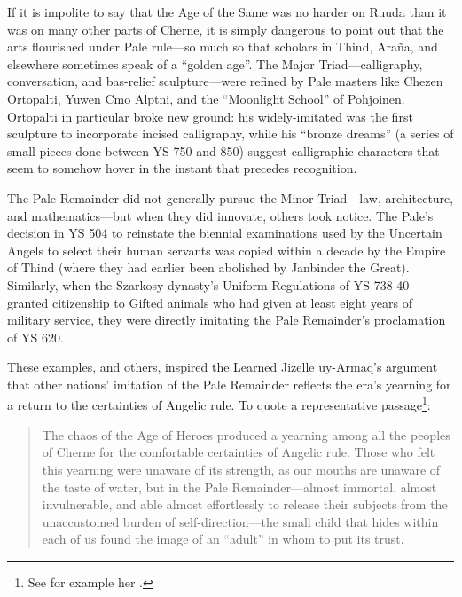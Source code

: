 \documentclass[12pt]{report}
\begin{document}
If it is impolite to say that the Age of the Same was no harder on
Ruuda than it was on many other parts of Cherne, it is simply
dangerous to point out that the arts flourished under Pale rule---so
much so that scholars in Thind, Ara\~na, and elsewhere sometimes speak
of a ``golden age''.  The Major Triad---calligraphy, conversation, and
bas-relief sculpture---were refined by Pale masters like Chezen
Ortopalti, Yuwen Cmo Alptni, and the ``Moonlight School'' of Pohjoinen.
Ortopalti in particular broke new ground: his widely-imitated
 was the first sculpture to
incorporate incised calligraphy, while his ``bronze dreams'' (a series
of small pieces done between YS 750 and 850) suggest calligraphic
characters that seem to somehow hover in the instant that precedes
recognition.

The Pale Remainder did not generally pursue the Minor Triad---law,
architecture, and mathematics---but when they did innovate, others
took notice.  The Pale's decision in YS 504 to reinstate the biennial
examinations used by the Uncertain Angels to select their human
servants was copied within a decade by the Empire of Thind (where they
had earlier been abolished by Janbinder the Great).  Similarly, when
the Szarkosy dynasty's Uniform Regulations of YS 738-40 granted
citizenship to Gifted animals who had given at least eight years of
military service, they were directly imitating the Pale Remainder's
proclamation of YS 620.

These examples, and others, inspired the Learned Jizelle uy-Armaq's
argument that other nations' imitation of the Pale Remainder reflects
the era's yearning for a return to the certainties of Angelic rule.
To quote a representative passage\footnote{See for example her
.}:

\begin{quotation}
The chaos of the Age of Heroes produced a yearning among all the
peoples of Cherne for the comfortable certainties of Angelic rule.
Those who felt this yearning were unaware of its strength, as our
mouths are unaware of the taste of water, but in the Pale
Remainder---almost immortal, almost invulnerable, and able almost
effortlessly to release their subjects from the unaccustomed burden of
self-direction---the small child that hides within each of us found
the image of an ``adult'' in whom to put its trust.
\end{quotation}
\end{document}
